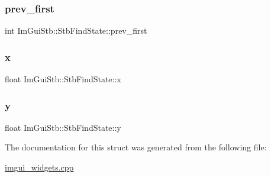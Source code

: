 \subsubsection{\texorpdfstring{prev\+\_\+first}{prev\_first}}
{\footnotesize\ttfamily int Im\+Gui\+Stb\+::\+Stb\+Find\+State\+::prev\+\_\+first}

\mbox{\label{struct_im_gui_stb_1_1_stb_find_state_a391de227ff11c00c2726988aed6fe5d6}} 
\subsubsection{\texorpdfstring{x}{x}}
{\footnotesize\ttfamily float Im\+Gui\+Stb\+::\+Stb\+Find\+State\+::x}

\mbox{\label{struct_im_gui_stb_1_1_stb_find_state_a16d674ba203b37cecd265f02bc679449}} 
\subsubsection{\texorpdfstring{y}{y}}
{\footnotesize\ttfamily float Im\+Gui\+Stb\+::\+Stb\+Find\+State\+::y}



The documentation for this struct was generated from the following file\+:\begin{DoxyCompactItemize}
\item 
\mbox{\hyperlink{imgui__widgets_8cpp}{imgui\+\_\+widgets.\+cpp}}\end{DoxyCompactItemize}
